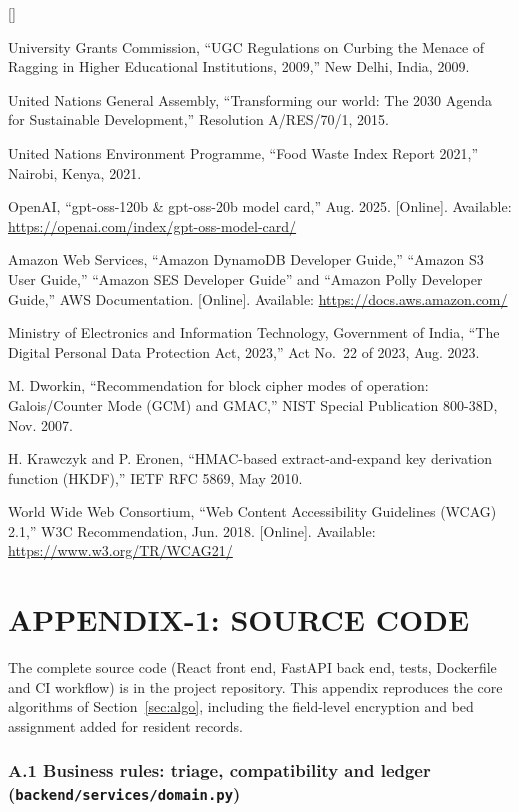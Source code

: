 \documentclass[12pt,a4paper,oneside]{report}
\begin{document}
\begin{list}{[]}{\setlength{\labelwidth}{2.2em}\setlength{\leftmargin}{2.8em}%
  \setlength{\labelsep}{0.6em}\setlength{\itemsep}{4pt}\setlength{\parsep}{0pt}}
\item University Grants Commission, ``UGC Regulations on Curbing the Menace of Ragging in Higher Educational Institutions, 2009,'' New Delhi, India, 2009.
\item United Nations General Assembly, ``Transforming our world: The 2030 Agenda for Sustainable Development,'' Resolution A/RES/70/1, 2015.
\item United Nations Environment Programme, ``Food Waste Index Report 2021,'' Nairobi, Kenya, 2021.
\item OpenAI, ``gpt-oss-120b \& gpt-oss-20b model card,'' Aug. 2025. [Online]. Available: \url{https://openai.com/index/gpt-oss-model-card/}
\item Amazon Web Services, ``Amazon DynamoDB Developer Guide,'' ``Amazon S3 User Guide,'' ``Amazon SES Developer Guide'' and ``Amazon Polly Developer Guide,'' AWS Documentation. [Online]. Available: \url{https://docs.aws.amazon.com/}
\item Ministry of Electronics and Information Technology, Government of India, ``The Digital Personal Data Protection Act, 2023,'' Act No.~22 of 2023, Aug. 2023.
\item M. Dworkin, ``Recommendation for block cipher modes of operation: Galois/Counter Mode (GCM) and GMAC,'' NIST Special Publication 800-38D, Nov. 2007.
\item H. Krawczyk and P. Eronen, ``HMAC-based extract-and-expand key derivation function (HKDF),'' IETF RFC 5869, May 2010.
\item World Wide Web Consortium, ``Web Content Accessibility Guidelines (WCAG) 2.1,'' W3C Recommendation, Jun. 2018. [Online]. Available: \url{https://www.w3.org/TR/WCAG21/}
\end{list}

\chapter{APPENDIX-1: SOURCE CODE}
The complete source code (React front end, FastAPI back end, tests, Dockerfile and CI workflow) is in the project
repository. This appendix reproduces the core algorithms of Section~\ref{sec:algo}, including the field-level
encryption and bed assignment added for resident records.

\subsection*{A.1 Business rules: triage, compatibility and ledger (\texttt{backend/services/domain.py})}

\end{document}
